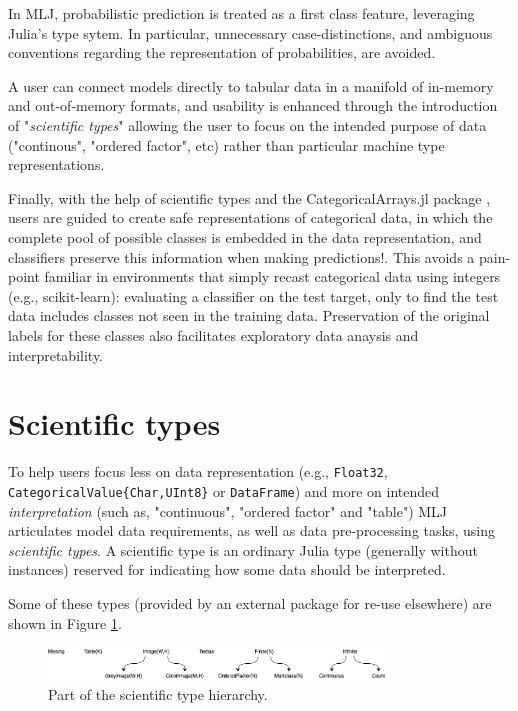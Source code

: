 \documentclass{article}
\begin{document}
In MLJ, probabilistic prediction is treated as a first class feature, leveraging Julia's type sytem. In particular, unnecessary case-distinctions, and ambiguous conventions regarding the representation of probabilities, are avoided.

A user can connect models directly to tabular data in a manifold of in-memory and out-of-memory formats, and usability is enhanced through the introduction of "\textit{scientific types}" allowing the user to focus on the intended purpose of data ("continous", "ordered factor", etc) rather than particular machine type representations.

Finally, with the help of scientific types and the CategoricalArrays.jl package \cite{CategoricalArrays}, users are guided to create safe representations of categorical data, in which the complete pool of possible classes is embedded in the data representation, and classifiers preserve this information when making predictions!. This avoids a pain-point familiar in environments that simply recast categorical data using integers (e.g., scikit-learn): evaluating a classifier on the test target, only to find the test data includes classes not seen in the training data. Preservation of the original labels for these classes also facilitates exploratory data anaysis and interpretability.

\section{Scientific types}

To help users focus less on data representation (e.g., \texttt{Float32}, \texttt{CategoricalValue\{Char,UInt8\}} or \texttt{DataFrame}) and more on intended \textit{interpretation} (such as, "continuous", "ordered factor" and "table") MLJ articulates model data requirements, as well as data pre-processing tasks, using \textit{scientific types}. A scientific type is an ordinary Julia type (generally without instances) reserved for indicating how some data should be interpreted.

Some of these types (provided by an external package for re-use elsewhere) are shown in Figure \ref{fig:fig1}.

\begin{figure}
  \centering
  \includegraphics[width=0.8\textwidth]{scitypesII}
  \caption{Part of the scientific type hierarchy.}
  \label{fig:fig1}
\end{figure}
\end{document}
